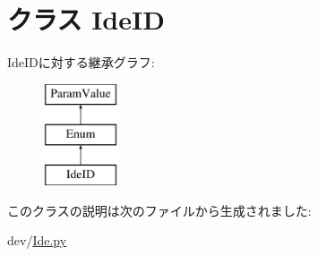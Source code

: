 \hypertarget{classIde_1_1IdeID}{
\section{クラス IdeID}
\label{classIde_1_1IdeID}
}
IdeIDに対する継承グラフ:\begin{figure}[H]
\begin{center}
\leavevmode
\includegraphics[height=3cm]{classIde_1_1IdeID}
\end{center}
\end{figure}


このクラスの説明は次のファイルから生成されました:\begin{DoxyCompactItemize}
\item 
dev/\hyperlink{Ide_8py}{Ide.py}\end{DoxyCompactItemize}

